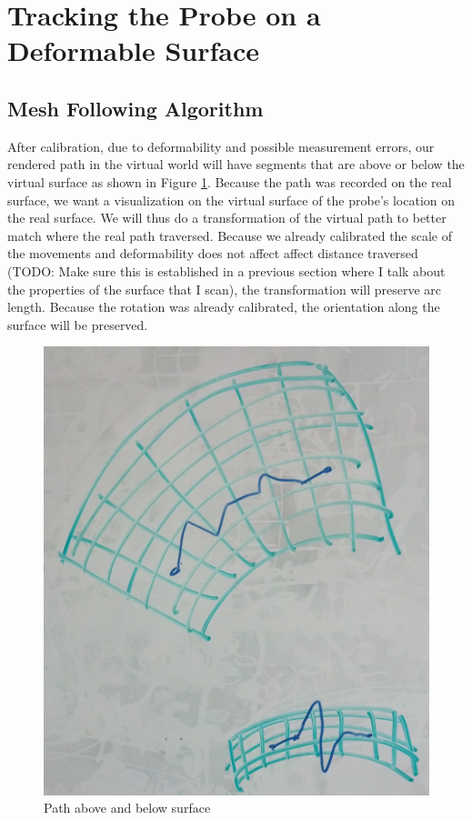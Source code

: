 \section{Tracking the Probe on a Deformable Surface}

\subsection{Mesh Following Algorithm}

After calibration, due to deformability and possible measurement errors, our rendered path in the virtual world will have segments that are above or below the virtual surface as shown in Figure \ref{pathsAboveAndBelow}. Because the path was recorded on the real surface, we want a visualization on the virtual surface of the probe's location on the real surface. We will thus do a transformation of the virtual path to better match where the real path traversed. Because we already calibrated the scale of the movements and deformability does not affect affect distance traversed (TODO: Make sure this is established in a previous section where I talk about the properties of the surface that I scan), the transformation will preserve arc length. Because the rotation was already calibrated, the orientation along the surface will be preserved.

\begin{figure}[ht]
\centering
\includegraphics[width=\columnwidth]{pathaboveandbelow.jpg}
\caption{Path above and below surface}
\label{pathsAboveAndBelow}
\end{figure}

